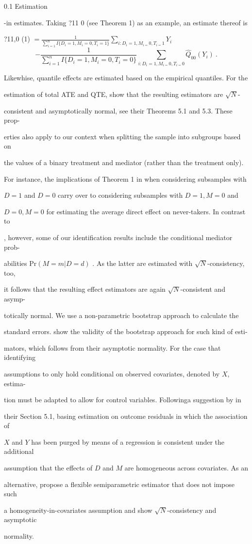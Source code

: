 \documentclass[a4paper,12pt]{article}
\begin{document}
0.1 Estimation

-in estimates. Taking ?11 0 (see Theorem 1) as an example, an estimate thereof is
\begin{center}
?11,0 (1) $=\displaystyle \frac{1}{\sum_{i=1}^{n}I\{D_{i}=1,M_{i}=0,T_{i}=1\}}\sum_{i:D_{i}=1,M_{i=}0,T_{i=}1}Y_{i}$
$$
-\frac{1}{\sum_{i=1}^{n}I\{D_{i}=1,M_{i}=0,T_{i}=0\}}\sum_{i:D_{i}=1,M_{i=}0,T_{i=}0}\hat{Q}_{00}(Y_{i})\ .
$$
\end{center}
Likewhise, quantile effects are estimated based on the empirical quantiles. For the

estimation of total ATE and QTE, show that the resulting estimators are $\sqrt{N}$-

consistent and asymptotically normal, see their Theorems 5.1 and 5.3. These prop-

erties also apply to our context when splitting the sample into subgroups based on

the values of a binary treatment and mediator (rather than the treatment only).

For instance, the implications of Theorem 1 in when considering subsamples with

$D = 1$ and $D = 0$ carry over to considering subsamples with $D = 1, M = 0$ and

$D=0, M=0$ for estimating the average direct effect on never-takers. In contrast to

, however, some of our identification results include the conditional mediator prob-

abilities $\mathrm{P}\mathrm{r}(M=m|D=d)$ . As the latter are estimated with $\sqrt{N}$-consistency, too,

it follows that the resulting effect estimators are again $\sqrt{N}$-consistent and asymp-

totically normal. We use a non-parametric bootstrap approach to calculate the

standard errors. show the validity of the bootstrap approach for such kind of esti-

mators, which follows from their asymptotic normality. For the case that identifying

assumptions to only hold conditional on observed covariates, denoted by $X$, estima-

tion must be adapted to allow for control variables. Followinga suggestion by in

their Section 5.1, basing estimation on outcome residuals in which the association of

$X$ and $Y$ has been purged by means of a regression is consistent under the additional

assumption that the effects of $D$ and $M$ are homogeneous across covariates. As an

alternative, propose a flexible semiparametric estimator that does not impose such

a homogeneity-in-covariates assumption and show $\sqrt{N}$-consistency and asymptotic

normality.
\end{document}
